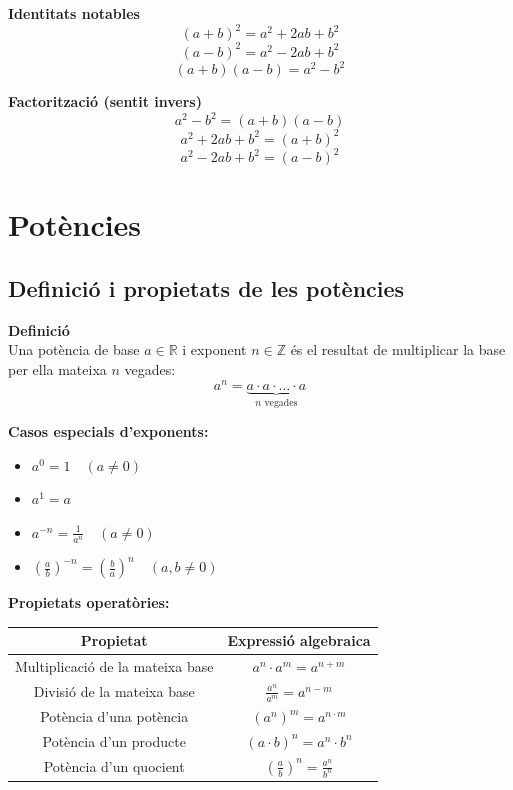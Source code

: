 \documentclass[12pt]{article}
\begin{document}
\begin{resum}[title=Resum del Tema 2: Productes Notables]
\textbf{Identitats notables}
\[
(a+b)^2 = a^2 + 2ab + b^2
\]
\[
(a-b)^2 = a^2 - 2ab + b^2
\]
\[
(a+b)(a-b) = a^2 - b^2
\]

\textbf{Factorització (sentit invers)}
\[
a^2 - b^2 = (a+b)(a-b)
\]
\[
a^2 + 2ab + b^2 = (a+b)^2
\]
\[
a^2 - 2ab + b^2 = (a-b)^2
\]
\end{resum}

\newpage

\section{Potències}

\subsection{Definició i propietats de les potències}

\begin{concept}
\textbf{Definició}\\
Una potència de base $a \in \mathbb{R}$ i exponent $n \in \mathbb{Z}$ és el resultat de multiplicar la base per ella mateixa $n$ vegades:
\[ a^n = \underbrace{a \cdot a \cdot \dots \cdot a}_{n \text{ vegades}} \]

\textbf{Casos especials d'exponents:}
\begin{itemize}
    \item $a^0 = 1 \quad (a \neq 0)$
    \item $a^1 = a$
    \item $a^{-n} = \frac{1}{a^n} \quad (a \neq 0)$
    \item $\left(\frac{a}{b}\right)^{-n} = \left(\frac{b}{a}\right)^n \quad (a, b \neq 0)$
\end{itemize}

\textbf{Propietats operatòries:}
\begin{table}[H]
\centering
\small
\begin{tabular}{|c|c|}
\hline
\textbf{Propietat} & \textbf{Expressió algebraica} \\ \hline
Multiplicació de la mateixa base & $a^n \cdot a^m = a^{n+m}$ \\ \hline
Divisió de la mateixa base & $\frac{a^n}{a^m} = a^{n-m}$ \\ \hline
Potència d'una potència & $(a^n)^m = a^{n \cdot m}$ \\ \hline
Potència d'un producte & $(a \cdot b)^n = a^n \cdot b^n$ \\ \hline
Potència d'un quocient & $\left(\frac{a}{b}\right)^n = \frac{a^n}{b^n}$ \\ \hline
\end{tabular}
\end{table}
\end{concept}
\end{document}
